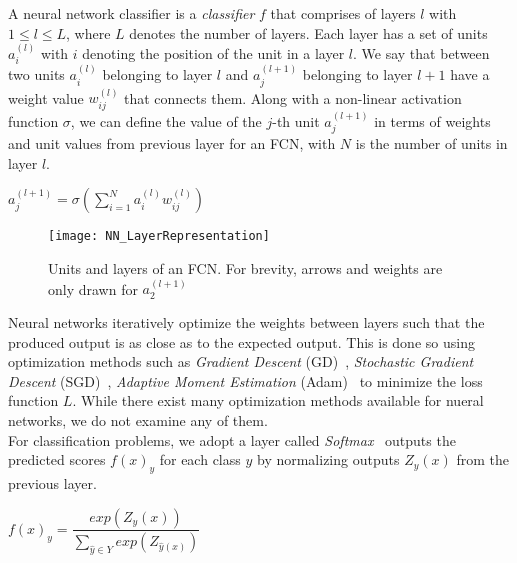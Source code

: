 \begin{definition}
    A neural network classifier is a \emph{classifier} $f$ that comprises of layers $l$ with $1 \leq l \leq L$, where $L$ denotes the number of layers. Each layer has a set of units $a_i^{(l)}$ with $i$ denoting the position of the unit in
    a layer $l$. We say that between two units $a_i^{(l)}$ belonging to layer $l$ and $a_j^{(l+1)}$ belonging to layer
    $l+1$ have a weight value $w_{ij}^{(l)}$ that connects them. Along with a non-linear activation function $\sigma$, we
    can define the value of the $j$-th unit $a_j^{(l+1)}$ in terms of weights and unit values from previous layer for an FCN, with $N$ is the number of units in layer $l$.
    \begin{center}
        $a_j^{(l+1)} = \sigma(\sum_{i=1}^{N} a_i^{(l)} w_{ij}^{(l)})$
    \end{center}
\end{definition}
\begin{figure}
    \centering
    \texttt{[image: NN\_LayerRepresentation]}
    \caption[Units and layers of an FCN]{Units and layers of an FCN. For brevity, arrows and weights are only drawn for $a_2^{(l+1)}$}
    \label{fig:NN_LayerRepresentation}
\end{figure}
Neural networks iteratively optimize the weights between layers such that the produced output is as close as to the
expected output. This is done so using optimization methods such as \emph{Gradient Descent} (GD)~\parencite{GD_Cauchy},
\emph{Stochastic Gradient Descent} (SGD)~\parencite{SGD_Robbins}, \emph{Adaptive Moment Estimation} (Adam)~\parencite{Adam_Kingma} to minimize the loss function $L$. While there exist many optimization methods available for nueral networks, we do not examine any of them.\\
For classification problems, we adopt a layer called \emph{Softmax}~\parencite{Softmax_Bridle} outputs the predicted scores $f(x)_y$ for each class $y$ by normalizing outputs $Z_y(x)$ from the previous layer.\\
\begin{center}
    $f(x)_y = \dfrac{exp(Z_y(x))}{\sum_{\hat{y} \in Y} exp(Z_{\hat{y}(x)})}$
\end{center}
